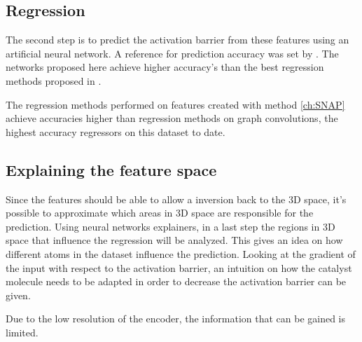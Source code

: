 \subsection{Regression}

The second step is to predict the activation barrier from these features using an artificial neural network.
A reference for prediction accuracy was set by \cite{friederich_dos}.
The networks proposed here achieve higher accuracy's than the best regression methods proposed in \cite{friederich_dos}.

The regression methods performed on features created with method \ref{ch:SNAP} achieve accuracies higher than regression methods on graph convolutions,
the highest accuracy regressors on this dataset to date.

\subsection{Explaining the feature space}
Since the features should be able to allow a inversion back to the 3D space, it's possible to approximate which areas in 3D space are responsible for the prediction.
Using neural networks explainers, in  a last step the regions in 3D space that influence the regression will be analyzed.
This gives an idea on how different atoms in the dataset influence the prediction.
Looking at the gradient of the input with respect to the activation barrier, an intuition on how the catalyst molecule needs to be 
adapted in order to decrease the activation barrier can be given.

Due to the low resolution of the encoder, the information that can be gained is limited.